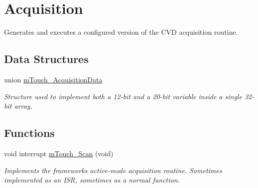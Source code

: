 \hypertarget{group___acquisition}{}\section{Acquisition}
\label{group___acquisition}


Generates and executes a configured version of the C\+V\+D acquisition routine.  


\subsection*{Data Structures}
\begin{DoxyCompactItemize}
\item 
union \hyperlink{unionm_touch___acquisition_data}{m\+Touch\+\_\+\+Acquisition\+Data}
\begin{DoxyCompactList}\small\item\em Structure used to implement both a 12-\/bit and a 20-\/bit variable inside a single 32-\/bit array. \end{DoxyCompactList}\end{DoxyCompactItemize}
\subsection*{Functions}
\begin{DoxyCompactItemize}
\item 
void interrupt \hyperlink{group___acquisition_gaeeee5d5e14eaff7df78e9ad5d7ac9769}{m\+Touch\+\_\+\+Scan} (void)
\begin{DoxyCompactList}\small\item\em Implements the framework\textquotesingle{}s active-\/mode acquisition routine. Sometimes implemented as an I\+S\+R, sometimes as a normal function. \end{DoxyCompactList}\end{DoxyCompactItemize}
